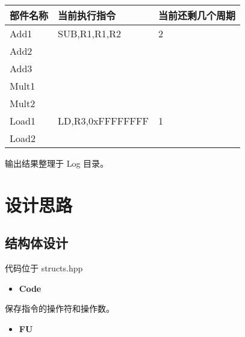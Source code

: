 \documentclass{article}
\newlength\tablewidth
\begin{document}
\begin{center}
\setlength\tablewidth{\dimexpr (\textwidth -6\tabcolsep)}
\begin{tabular}{|p{0.333\tablewidth}<{\centering}|p{0.333\tablewidth}<{\centering}|p{0.333\tablewidth}<{\centering}|}
\hline
\rowcolor{tabletopgray}
\textbf{ 部件名称 }&\textbf{ 当前执行指令     }&\textbf{ 当前还剩几个周期 }\\
\hline
 Add1     & SUB,R1,R1,R2     & 2                \\
\hline
 Add2     &                  &                  \\
\hline
 Add3     &                  &                  \\
\hline
 Mult1    &                  &                  \\
\hline
 Mult2    &                  &                  \\
\hline
 Load1    & LD,R3,0xFFFFFFFF & 1                \\
\hline
 Load2    &                  &                  \\
\hline
\end{tabular}
\end{center}



输出结果整理于 Log 目录。


\section{设计思路}




\subsection{结构体设计}




代码位于 structs.hpp


\begin{itemize}
\item
\textbf{Code}
\end{itemize}



保存指令的操作符和操作数。


\begin{itemize}
\item
\textbf{FU}
\end{itemize}
\end{document}
